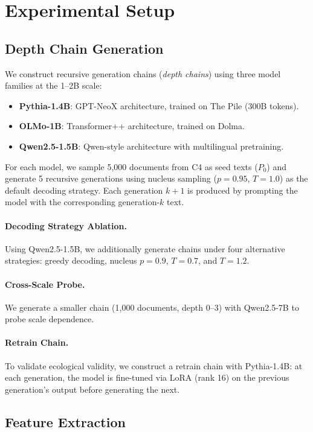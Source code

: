 \documentclass[11pt,a4paper]{article}
\begin{document}
\section{Experimental Setup}

\subsection{Depth Chain Generation}

We construct recursive generation chains (\emph{depth chains}) using three model families at the 1--2B scale:
\begin{itemize}
\item \textbf{Pythia-1.4B}: GPT-NeoX architecture, trained on The Pile (300B tokens).
\item \textbf{OLMo-1B}: Transformer++ architecture, trained on Dolma.
\item \textbf{Qwen2.5-1.5B}: Qwen-style architecture with multilingual pretraining.
\end{itemize}

For each model, we sample 5,000 documents from C4 as seed texts ($P_0$) and generate 5 recursive generations using nucleus sampling ($p=0.95$, $T=1.0$) as the default decoding strategy. Each generation $k+1$ is produced by prompting the model with the corresponding generation-$k$ text.

\paragraph{Decoding Strategy Ablation.} Using Qwen2.5-1.5B, we additionally generate chains under four alternative strategies: greedy decoding, nucleus $p=0.9$, $T=0.7$, and $T=1.2$.

\paragraph{Cross-Scale Probe.} We generate a smaller chain (1,000 documents, depth 0--3) with Qwen2.5-7B to probe scale dependence.

\paragraph{Retrain Chain.} To validate ecological validity, we construct a retrain chain with Pythia-1.4B: at each generation, the model is fine-tuned via LoRA (rank 16) on the previous generation's output before generating the next.

\subsection{Feature Extraction}
\end{document}
